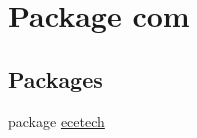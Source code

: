 \hypertarget{namespacecom}{}\section{Package com}
\label{namespacecom}
\subsection*{Packages}
\begin{DoxyCompactItemize}
\item 
package \hyperlink{namespacecom_1_1ecetech}{ecetech}
\end{DoxyCompactItemize}
